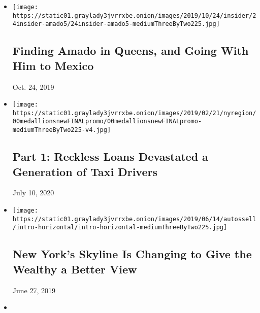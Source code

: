 \begin{itemize}
\item
  \href{https://www.nytimes3xbfgragh.onion/2019/10/23/reader-center/immigrants-queens-photography.html}{}

  \texttt{[image: https://static01.graylady3jvrrxbe.onion/images/2019/10/24/insider/24insider-amado5/24insider-amado5-mediumThreeByTwo225.jpg]}

  \hypertarget{finding-amado-in-queens-and-going-with-him-to-mexico}{%
  \subsection{Finding Amado in Queens, and Going With Him to
  Mexico}\label{finding-amado-in-queens-and-going-with-him-to-mexico}}

  Oct. 24, 2019
\item
  \href{https://www.nytimes3xbfgragh.onion/2019/05/19/nyregion/nyc-taxis-medallions-suicides.html}{}

  \texttt{[image: https://static01.graylady3jvrrxbe.onion/images/2019/02/21/nyregion/00medallionsnewFINALpromo/00medallionsnewFINALpromo-mediumThreeByTwo225-v4.jpg]}

  \hypertarget{part-1-reckless-loans-devastated-a-generation-of-taxi-drivers}{%
  \subsection{Part 1: Reckless Loans Devastated a Generation of Taxi
  Drivers}\label{part-1-reckless-loans-devastated-a-generation-of-taxi-drivers}}

  July 10, 2020
\item
  \href{https://www.nytimes3xbfgragh.onion/interactive/2019/06/14/nyregion/new-york-skyline-inequality.html}{}

  \texttt{[image: https://static01.graylady3jvrrxbe.onion/images/2019/06/14/autossell/intro-horizontal/intro-horizontal-mediumThreeByTwo225.jpg]}

  \hypertarget{new-yorks-skyline-is-changing-to-give-the-wealthy-a-better-view}{%
  \subsection{New York's Skyline Is Changing to Give the Wealthy a
  Better
  View}\label{new-yorks-skyline-is-changing-to-give-the-wealthy-a-better-view}}

  June 27, 2019
\item
  \href{https://www.nytimes3xbfgragh.onion/interactive/2018/10/30/nyregion/homeless-children.html}{}


\end{itemize}
